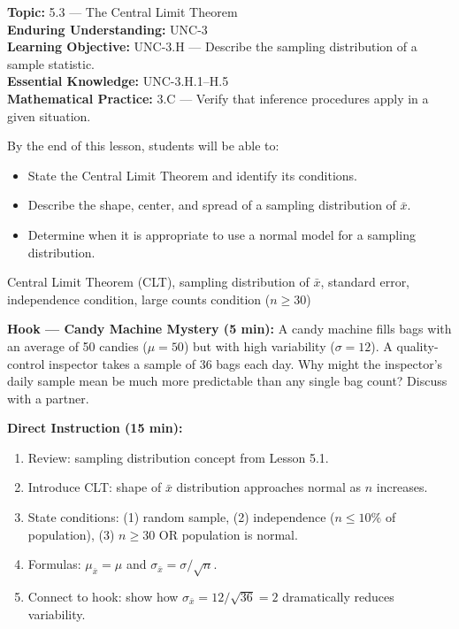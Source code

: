 \documentclass[10pt]{article}
\begin{document}

\begin{objectivebox}
\textbf{Topic:} 5.3 — The Central Limit Theorem\\
\textbf{Enduring Understanding:} UNC-3\\
\textbf{Learning Objective:} UNC-3.H — Describe the sampling distribution of a sample statistic.\\
\textbf{Essential Knowledge:} UNC-3.H.1–H.5\\
\textbf{Mathematical Practice:} 3.C — Verify that inference procedures apply in a given situation.
\end{objectivebox}

\begin{learningtargetbox}
By the end of this lesson, students will be able to:
\begin{itemize}
  \item State the Central Limit Theorem and identify its conditions.
  \item Describe the shape, center, and spread of a sampling distribution of $\bar{x}$.
  \item Determine when it is appropriate to use a normal model for a sampling distribution.
\end{itemize}
\end{learningtargetbox}

\begin{vocabbox}
Central Limit Theorem (CLT), sampling distribution of $\bar{x}$, standard error, independence condition, large counts condition ($n \ge 30$)
\end{vocabbox}

\begin{hookbox}
\textbf{Hook — Candy Machine Mystery (5 min):}
A candy machine fills bags with an average of 50 candies ($\mu = 50$) but with high variability ($\sigma = 12$). A quality-control inspector takes a sample of 36 bags each day. Why might the inspector's daily sample mean be much more predictable than any single bag count? Discuss with a partner.
\end{hookbox}

\begin{notesbox}
\textbf{Direct Instruction (15 min):}
\begin{enumerate}
  \item Review: sampling distribution concept from Lesson 5.1.
  \item Introduce CLT: shape of $\bar{x}$ distribution approaches normal as $n$ increases.
  \item State conditions: (1) random sample, (2) independence ($n \le 10\%$ of population), (3) $n \ge 30$ OR population is normal.
  \item Formulas: $\mu_{\bar{x}} = \mu$ and $\sigma_{\bar{x}} = \sigma/\sqrt{n}$.
  \item Connect to hook: show how $\sigma_{\bar{x}} = 12/\sqrt{36} = 2$ dramatically reduces variability.
\end{enumerate}
\end{notesbox}
\end{document}
